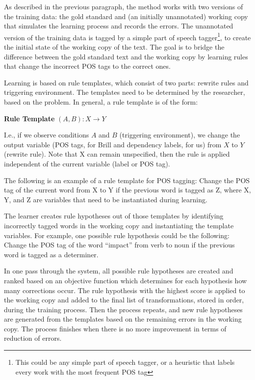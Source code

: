 As described in the previous paragraph, the method works with two versions of the training data: the gold standard and (an initially unannotated) working copy that simulates the learning process and records the errors. The unannotated version of the training data is tagged by a simple part of speech tagger\footnote{This could be any simple part of speech tagger, or a heuristic that labels every work with the most frequent POS tag}, to create the initial state of the working copy of the text.  The goal is to bridge the difference between the gold standard text and the working copy by learning rules that change the incorrect POS tags to the correct ones. 

Learning is based on rule templates, which consist of two parts: rewrite rules and triggering environment. The templates need to be determined by the researcher, based on the problem. In general, a rule template is of the form:


\textbf{Rule Template} ${(A, B): X \rightarrow Y} $

I.e., if we observe conditions $A$ and $B$ (triggering environment), we change the output variable (POS tags, for Brill and dependency labels, for us) 
from $X$ to $Y$ (rewrite rule). Note that X can remain unspecified, then the rule is applied independent of the current variable (label or POS tag).

The following is an example of a rule template for POS tagging: Change the POS tag of the current word from X to Y if the previous word is tagged as Z, where X, Y, and Z are variables that need to be instantiated during learning. 

The learner creates rule hypotheses out of those templates by identifying incorrectly tagged words in the working copy and instantiating the template variables.
For example, one possible rule hypothesis could be the following: Change the POS tag of the word ``impact'' from verb to noun if the previous word is tagged as a determiner. %

In one pass through the system, all possible rule hypotheses are created and ranked  based on an objective function which determines for each hypothesis how many corrections occur. The rule hypothesis with the highest score is applied to the working copy and added to the final list of transformations, stored in order, during the training process. Then the process repeats, and new rule hypotheses are generated from the templates based on the remaining errors in the working copy. The process finishes when there is no more improvement in terms of reduction of errors.~


